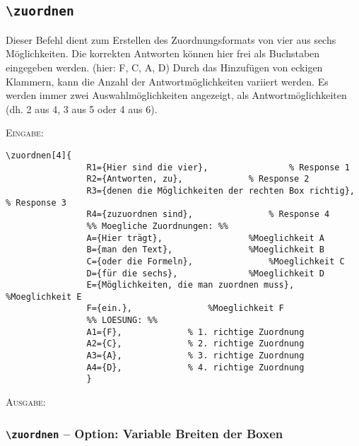 \documentclass[a4paper,12pt]{article}
\begin{document}
\subsection{\texttt{\textbackslash zuordnen}}
Dieser Befehl dient zum Erstellen des Zuordnungsformats von vier aus sechs Möglichkeiten.
Die korrekten Antworten können hier frei als Buchstaben eingegeben werden. (hier: F, C, A, D)
Durch das Hinzufügen von eckigen Klammern, kann die Anzahl der Antwortmöglichkeiten variiert werden. Es werden immer zwei Auswahlmöglichkeiten angezeigt, als Antwortmöglichkeiten (dh. 2 aus 4, 3 aus 5 oder 4 aus 6). 

\leer

\textsc{Eingabe:}
\begin{verbatim}
\zuordnen[4]{
				R1={Hier sind die vier},				% Response 1
				R2={Antworten, zu},				% Response 2
				R3={denen die Möglichkeiten der rechten Box richtig},				% Response 3
				R4={zuzuordnen sind},				% Response 4
				%% Moegliche Zuordnungen: %%
				A={Hier trägt}, 				%Moeglichkeit A  
				B={man den Text}, 				%Moeglichkeit B  
				C={oder die Formeln}, 				%Moeglichkeit C  
				D={für die sechs}, 				%Moeglichkeit D  
				E={Möglichkeiten, die man zuordnen muss}, 				%Moeglichkeit E  
				F={ein.}, 				%Moeglichkeit F  
				%% LOESUNG: %%
				A1={F},				% 1. richtige Zuordnung
				A2={C},				% 2. richtige Zuordnung
				A3={A},				% 3. richtige Zuordnung
				A4={D},				% 4. richtige Zuordnung
				}
\end{verbatim}
\leer

\textsc{Ausgabe:}


\subsubsection{\texttt{\textbackslash zuordnen} -- Option: Variable Breiten der Boxen}
\end{document}
